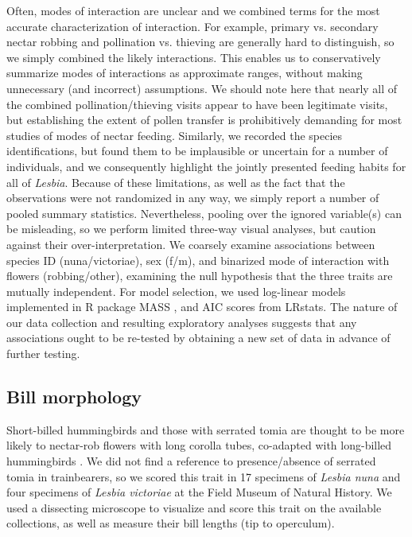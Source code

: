 \documentclass[fleqn,10pt,lineno]{wlpeerj}
\begin{document}
Often, modes of interaction are unclear and we combined terms for the most accurate characterization of interaction. 
For example, primary vs. secondary nectar robbing and pollination vs. thieving are generally hard to distinguish, so we simply combined the likely interactions. 
This enables us to conservatively summarize modes of interactions as approximate ranges, without making unnecessary (and incorrect) assumptions.
We should note here that nearly all of the combined pollination/thieving visits appear to have been legitimate visits, but establishing the extent of pollen transfer is prohibitively demanding for most studies of modes of nectar feeding.
Similarly, we recorded the species identifications, but found them to be implausible or uncertain for a number of individuals, and we consequently highlight the jointly presented feeding habits for all of \textit{Lesbia}. %
Because of these limitations, as well as the fact that the observations were not randomized in any way, we simply report a number of pooled summary statistics. 
Nevertheless, pooling over the ignored variable(s) can be misleading, so we perform limited three-way visual analyses, but caution against their over-interpretation. 
We coarsely examine associations between  species ID (nuna/victoriae), sex (f/m), and binarized mode of interaction with flowers (robbing/other), examining the null hypothesis that the three traits are mutually independent.
For model selection, we used log-linear models implemented in R package MASS \citep{R}, and AIC scores from LRstats.
The nature of our data collection and resulting exploratory analyses suggests that any associations ought to be re-tested by obtaining a new set of data in advance of further testing.

\subsection*{Bill morphology}

Short-billed hummingbirds and those with serrated tomia are thought to be more likely to nectar-rob flowers with long corolla tubes, co-adapted with long-billed hummingbirds \citep{lara2001}. 
We did not find a reference to presence/absence of serrated tomia in trainbearers, so we scored this trait in 17 specimens of \textit{Lesbia nuna} and four specimens of \textit{Lesbia victoriae} at the Field Museum of Natural History. %
We used a dissecting microscope to visualize and score this trait on the available collections, as well as measure their bill lengths (tip to operculum). 
\\ 
\end{document}
